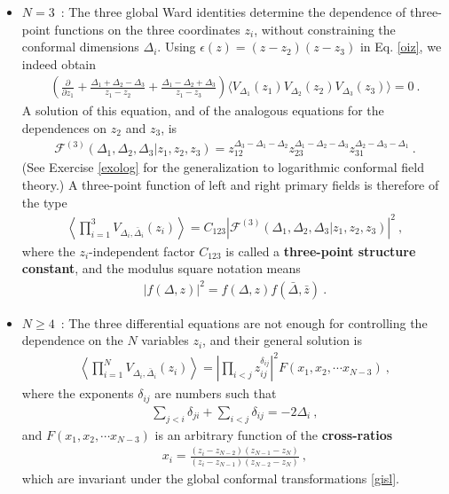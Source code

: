 \documentclass[12pt, a4paper, notitlepage, twoside]{report}
\numberwithin{equation}{section}
\theoremstyle{break}
\begin{document}
\begin{itemize}
\item $\boxed{N=3}$\ : The three global Ward identities determine the dependence of three-point functions on the three coordinates $z_i$, without constraining the conformal dimensions $\Delta_i$. Using $\epsilon(z)= (z-z_2)(z-z_3)$ in Eq. \eqref{oiz}, we indeed obtain
\begin{align}
  \left(  \frac{\partial}{\partial z_1} + \frac{\Delta_1+\Delta_2-\Delta_3}{z_1-z_2} +\frac{\Delta_1-\Delta_2+\Delta_3}{z_1-z_3} \right) \Big\langle V_{\Delta_1}(z_1)V_{\Delta_2}(z_2)V_{\Delta_3}(z_3)\Big\rangle= 0\ .
\end{align}
A solution of this equation, and of the analogous equations for the dependences on $z_2$ and $z_3$, is 
\begin{align}
 \boxed{\mathcal{F}^{(3)}(\Delta_1,\Delta_2,\Delta_3|z_1,z_2,z_3) = z_{12}^{\Delta_3-\Delta_1-\Delta_2} z_{23}^{\Delta_1-\Delta_2-\Delta_3} z_{31}^{\Delta_2-\Delta_3-\Delta_1}}\ .
\label{fzzz}
\end{align}
(See Exercise \ref{exolog} for the generalization to logarithmic conformal field theory.)
A three-point function of left and right primary fields is therefore of the type
\begin{align}
 \boxed{ \left\langle \prod_{i=1}^3 V_{\Delta_i,\bar{\Delta}_i}(z_i) \right\rangle = C_{123}
 \left|\mathcal{F}^{(3)}(\Delta_1,\Delta_2,\Delta_3|z_1,z_2,z_3)\right|^2 }\ ,
\label{cff}
\end{align}
where the $z_i$-independent factor
$C_{123}$ is called a \textbf{\boldmath three-point structure constant}, and the modulus square notation means 
\begin{align}
|f(\Delta,z)|^2 = f(\Delta,z)f(\bar{\Delta},\bar{z})\ .
\label{eq:msn}
\end{align}

\item $\boxed{N\geq 4}$\ : The three differential equations are not enough for controlling the dependence on the $N$ variables $z_i$, and their general solution is 
\begin{align}
 \left\langle\prod_{i=1}^N V_{\Delta_i,\bar\Delta_i}(z_i)\right\rangle = \left|\prod_{i<j} z_{ij}^{\delta_{ij}}\right|^2 F(x_1,x_2,\cdots x_{N-3}) \ ,
\label{xfxn}
\end{align}
where the exponents $\delta_{ij}$ are numbers such that 
\begin{align}
 \sum_{j< i} \delta_{ji} +\sum_{i<j}\delta_{ij} = -2\Delta_i\ ,
 \label{sdd}
\end{align}
and $F(x_1,x_2,\cdots x_{N-3})$ is an arbitrary function of the \textbf{\boldmath cross-ratios}
\begin{align}
 x_i = \frac{(z_i-z_{N-2})(z_{N-1}-z_N)}{(z_i-z_{N-1})(z_{N-2}-z_N)}\ ,
\end{align}
which are invariant under the global conformal transformations \eqref{gisl}.


\end{itemize}
\end{document}
